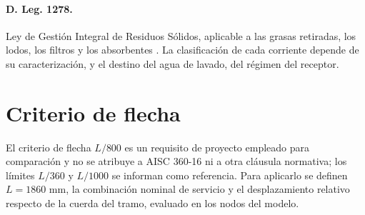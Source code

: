 \paragraph{D. Leg. 1278.} Ley de Gestión Integral de Residuos Sólidos, aplicable a las grasas retiradas, los lodos, los filtros y los absorbentes \cite{dleg1278}. La clasificación de cada corriente depende de su caracterización, y el destino del agua de lavado, del régimen del receptor.

\section{Criterio de flecha}

El criterio de flecha $L/800$ es un requisito de proyecto empleado para comparación y no se atribuye a AISC 360-16 ni a otra cláusula normativa; los límites $L/360$ y $L/1000$ se informan como referencia. Para aplicarlo se definen $L=1860$ mm, la combinación nominal de servicio y el desplazamiento relativo respecto de la cuerda del tramo, evaluado en los nodos del modelo.
